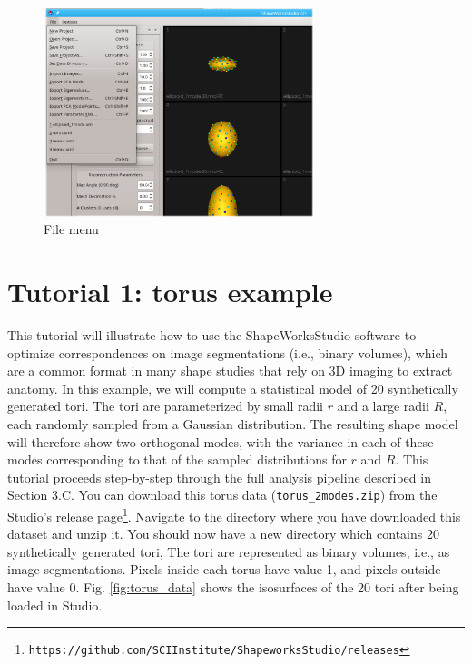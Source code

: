 \documentclass[letterpaper,12pt]{article}   %
\begin{document}
\begin{figure}[!htp]
	\centering
	\includegraphics[width=0.7\textwidth]{figs_v2/filemenu.png}
	\caption{File menu}
	\label{fig:filemenu}
\end{figure}

\section{Tutorial 1: torus example}

This tutorial will illustrate how to use the ShapeWorksStudio software to optimize correspondences on image segmentations (i.e., binary volumes), which are a common format in many shape studies that rely on 3D imaging to extract anatomy. In this example, we will compute a statistical model of 20 synthetically generated tori. The tori are parameterized by small radii $r$ and a large radii $R$, each randomly sampled from a Gaussian distribution. The resulting shape model will therefore show two orthogonal modes, with the variance in each of these modes corresponding to that of the sampled distributions for $r$ and $R$. This tutorial proceeds step-by-step through the full analysis pipeline described in Section 3.C.  You can download this torus data (\texttt{torus\_2modes.zip}) from the Studio's release page\footnote{\texttt{https://github.com/SCIInstitute/ShapeworksStudio/releases}}. Navigate to the directory where you have downloaded this dataset and unzip it. You should now have a new directory which contains 20 synthetically generated tori, The tori are represented as binary volumes, i.e., as image segmentations. Pixels inside each torus have value 1, and pixels outside have value 0. Fig. \ref{fig:torus_data} shows the isosurfaces of the 20 tori after being loaded in Studio.
\end{document}
